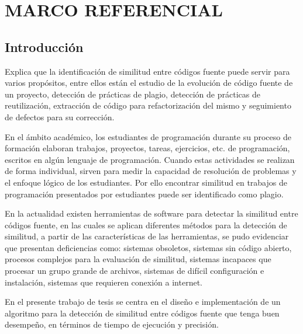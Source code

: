 \chapter{MARCO REFERENCIAL}
\section{Introducción}
\cite{Cheers2021} Explica que la identificación de similitud entre códigos fuente puede servir para varios propósitos, entre ellos están el estudio de la evolución de código fuente de un proyecto, detección de prácticas de plagio, detección de prácticas de reutilización, extracción de código para refactorización del mismo y seguimiento de defectos para su corrección.

En el ámbito académico, los estudiantes de programación durante su proceso de formación elaboran trabajos, proyectos, tareas, ejercicios, etc. de programación, escritos en algún lenguaje de programación. Cuando estas actividades se realizan de forma individual, sirven para medir la capacidad de resolución de problemas y el enfoque lógico de los estudiantes. Por ello encontrar similitud en trabajos de programación presentados por estudiantes puede ser identificado como plagio.

En la actualidad existen herramientas de software para detectar la similitud entre códigos fuente, en las cuales se aplican diferentes métodos para la detección de similitud, a partir de las características de las herramientas, se pudo evidenciar que presentan deficiencias como: sistemas obsoletos, sistemas sin código abierto, procesos complejos para la evaluación de similitud, sistemas incapaces que procesar un grupo grande de archivos, sistemas de difícil configuración e instalación, sistemas que requieren conexión a internet.

En el presente trabajo de tesis se centra en el diseño e implementación de un algoritmo para la detección de similitud entre códigos fuente que tenga buen desempeño, en términos de tiempo de ejecución y precisión.


